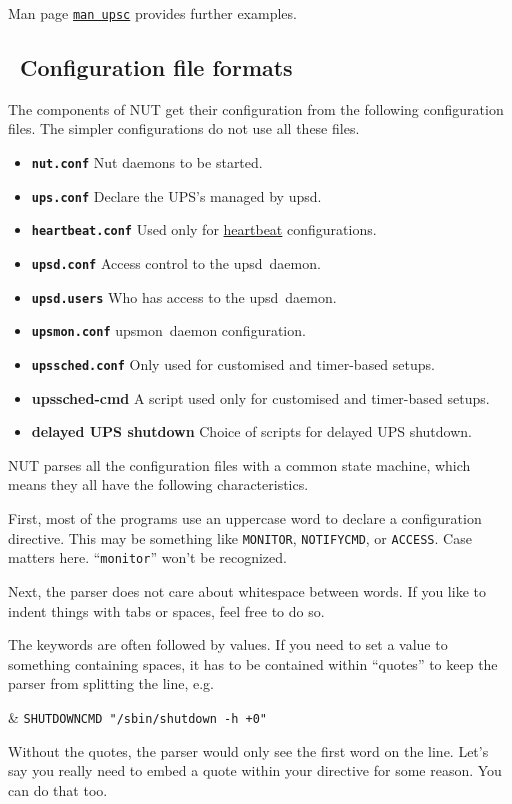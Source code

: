 \documentclass[12pt]{article}
\newlength{\headersep}\setlength{\headersep}{3mm}
\newcommand{\Hsep}{\hspace{\headersep}}
\newcommand{\upsd}{\mbox{\textcolor{UPSDCOLOUR}{upsd}}}
\newcommand{\upsmon}{\mbox{\textcolor{MONCOLOUR}{upsmon}}}
\newcommand{\upsschedcmd}{\mbox{\textcolor{CMDCOLOUR}{upssched-cmd}}}
\newcommand{\nutconf}{\textcolor{NUTCOLOUR}{\texttt{nut.conf}}}
\newcommand{\upsconf}{\textcolor{UPSDCOLOUR}{\texttt{ups.conf}}}
\newcommand{\heartbeatconf}{\textcolor{UPSDCOLOUR}{\texttt{heartbeat.conf}}}
\newcommand{\upsdconf}{\textcolor{UPSDCOLOUR}{\texttt{upsd.conf}}}
\newcommand{\upsdusers}{\textcolor{UPSDCOLOUR}{\texttt{upsd.users}}}
\newcommand{\upsmonconf}{\textcolor{MONCOLOUR}{\texttt{upsmon.conf}}}
\newcommand{\upsschedconf}{\textcolor{SCHEDCOLOUR}{\texttt{upssched.conf}}}
\newcommand{\NUTman}[1]{\href{http://networkupstools.org/docs/man/#1.html}{\texttt{man #1}}}
\newcommand{\ul}{\begin{itemize}%
   \setlength{\itemsep}{0em}}
\newcommand{\eul}{\end{itemize}}
\newcommand{\li}{\item}                 %
\begin{document}
\noindent Man page \NUTman{upsc} provides further examples.



\subsection{\Hsep\ Configuration file formats}\label{section:conffileformat}

The components of NUT get their configuration from the following configuration files.
The simpler configurations do not use all these files.

\ul
\li \textbf{\nutconf}       \quad Nut daemons to be started.
\li \textbf{\upsconf}       \quad Declare the UPS's managed by \upsd.
\li \textbf{\heartbeatconf} \quad Used only for \hyperref[heartbeat]{heartbeat} configurations.
\li \textbf{\upsdconf}      \quad Access control to the \upsd\ daemon.
\li \textbf{\upsdusers}     \quad Who has access to the \upsd\ daemon.
\li \textbf{\upsmonconf}    \quad \upsmon\ daemon configuration.
\li \textbf{\upsschedconf}  \quad Only used for customised and timer-based setups.
\li \textbf{\upsschedcmd}   \quad A script used only for customised and timer-based setups.
\li \textbf{delayed UPS shutdown} \quad Choice of scripts for delayed UPS shutdown.
\eul

NUT parses all the configuration files with a common state machine, which
means they all have the following characteristics.

First, most of the programs use an uppercase word to declare a configuration
directive.  This may be something like \texttt{MONITOR}, \texttt{NOTIFYCMD},
or \texttt{ACCESS}.  Case matters here.  ``\texttt{monitor}'' won't be
recognized.

Next, the parser does not care about whitespace between words.  If you
like to indent things with tabs or spaces, feel free to do so.

The keywords are often followed by values. If you need to set a value to
something containing spaces, it has to be contained within ``quotes'' to keep
the parser from splitting the line, e.g.

\begin{LinePrinter}[0.9\LinePrinterwidth]
\Clunk & \verb`SHUTDOWNCMD "/sbin/shutdown -h +0"` \\
\end{LinePrinter}

Without the quotes, the parser would only see the first word on the line.
Let's say you really need to embed a quote within your directive for some
reason.  You can do that too.
\end{document}
